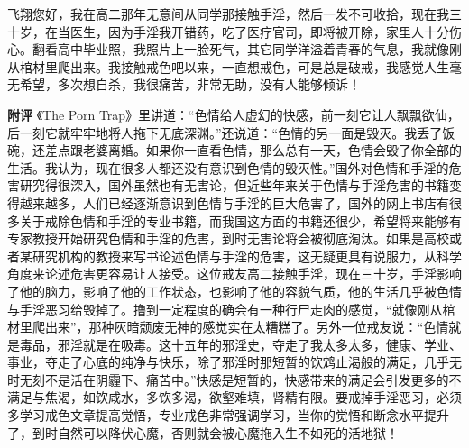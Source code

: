 \begin{case}
    飞翔您好，我在高二那年无意间从同学那接触手淫，然后一发不可收拾，现在我三十岁，在当医生，因为手淫我开错药，吃了医疗官司，即将被开除，家里人十分伤心。翻看高中毕业照，我照片上一脸死气，其它同学洋溢着青春的气息，我就像刚从棺材里爬出来。我接触戒色吧以来，一直想戒色，可是总是破戒，我感觉人生毫无希望，多次想自杀，我很痛苦，非常无助，没有人能够倾诉！

    \textbf{附评} 《The Porn Trap》里讲道：“色情给人虚幻的快感，前一刻它让人飘飘欲仙，后一刻它就牢牢地将人拖下无底深渊。”还说道：“色情的另一面是毁灭。我丢了饭碗，还差点跟老婆离婚。如果你一直看色情，那么总有一天，色情会毁了你全部的生活。我认为，现在很多人都还没有意识到色情的毁灭性。”国外对色情和手淫的危害研究得很深入，国外虽然也有无害论，但近些年来关于色情与手淫危害的书籍变得越来越多，人们已经逐渐意识到色情与手淫的巨大危害了，国外的网上书店有很多关于戒除色情和手淫的专业书籍，而我国这方面的书籍还很少，希望将来能够有专家教授开始研究色情和手淫的危害，到时无害论将会被彻底淘汰。如果是高校或者某研究机构的教授来写书论述色情与手淫的危害，这无疑更具有说服力，从科学角度来论述危害更容易让人接受。这位戒友高二接触手淫，现在三十岁，手淫影响了他的脑力，影响了他的工作状态，也影响了他的容貌气质，他的生活几乎被色情与手淫恶习给毁掉了。撸到一定程度的确会有一种行尸走肉的感觉，“就像刚从棺材里爬出来”，那种灰暗颓废无神的感觉实在太糟糕了。另外一位戒友说：“色情就是毒品，邪淫就是在吸毒。这十五年的邪淫史，夺走了我太多太多，健康、学业、事业，夺走了心底的纯净与快乐，除了邪淫时那短暂的饮鸩止渴般的满足，几乎无时无刻不是活在阴霾下、痛苦中。”快感是短暂的，快感带来的满足会引发更多的不满足与焦渴，如饮咸水，多饮多渴，欲壑难填，肾精有限。要戒掉手淫恶习，必须多学习戒色文章提高觉悟，专业戒色非常强调学习，当你的觉悟和断念水平提升了，到时自然可以降伏心魔，否则就会被心魔拖入生不如死的活地狱！
\end{case}

